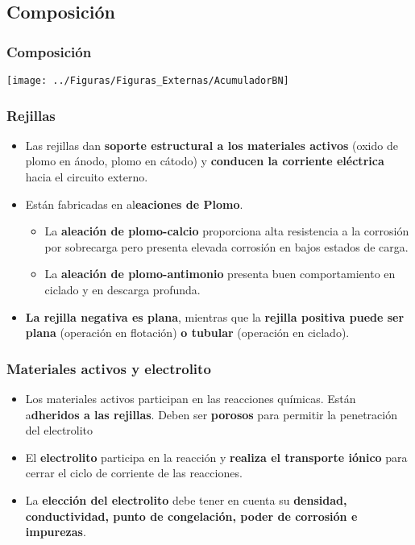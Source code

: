 \documentclass[serif, xcolor=dvipsnames]{beamer}
\begin{document}
\subsection{Composición}


\begin{frame}[plain]
\frametitle{Composición}

\begin{center}
\texttt{[image: ../Figuras/Figuras\_Externas/AcumuladorBN]}
\par\end{center}


\end{frame}

\begin{frame}
\frametitle{Rejillas}
\begin{itemize}
\item Las rejillas dan \textbf{soporte estructural a los materiales activos}
(oxido de plomo en ánodo, plomo en cátodo) y \textbf{conducen la corriente
eléctrica} hacia el circuito externo. 
\item Están fabricadas en al\textbf{eaciones de Plomo}. 

\begin{itemize}
\item La\textbf{ aleación de plomo-calcio} proporciona alta resistencia
a la corrosión por sobrecarga pero presenta elevada corrosión en bajos
estados de carga. 
\item La \textbf{aleación de plomo-antimonio} presenta buen comportamiento
en ciclado y en descarga profunda. 
\end{itemize}
\item \textbf{La rejilla negativa es plana}, mientras que la \textbf{rejilla
positiva puede ser plana} (operación en flotación) \textbf{o tubular
}(operación en ciclado).
\end{itemize}

\end{frame}

\begin{frame}
\frametitle{Materiales activos y electrolito}
\begin{itemize}
\item Los materiales activos participan en las reacciones químicas. Están
a\textbf{dheridos a las rejillas}. Deben ser \textbf{porosos} para
permitir la penetración del electrolito
\item El \textbf{electrolito} participa en la reacción y \textbf{realiza
el transporte iónico }para cerrar el ciclo de corriente de las reacciones. 
\item La \textbf{elección del electrolito} debe tener en cuenta su \textbf{densidad,
conductividad, punto de congelación, poder de corrosión e impurezas}. 
\end{itemize}

\end{frame}
\end{document}
